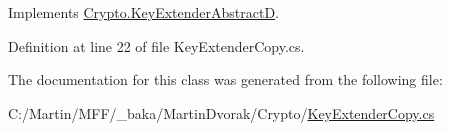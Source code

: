 Implements \hyperlink{class_crypto_1_1_key_extender_abstract_d_a954261bd6f533ad7745beac9ce89dd6e}{Crypto.\+Key\+Extender\+Abstract\+D}.



Definition at line 22 of file Key\+Extender\+Copy.\+cs.



The documentation for this class was generated from the following file\+:\begin{DoxyCompactItemize}
\item 
C\+:/\+Martin/\+M\+F\+F/\+\_\+baka/\+Martin\+Dvorak/\+Crypto/\hyperlink{_key_extender_copy_8cs}{Key\+Extender\+Copy.\+cs}\end{DoxyCompactItemize}
